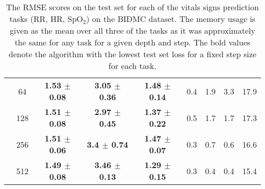 \begin{table}[t]
\begin{center}
\begin{tabular}{ccccccccc}
          & 64  &  \textbf{1.53 $\pm$ 0.08} &   \textbf{3.05 $\pm$ 0.36} &  \textbf{1.48 $\pm$ 0.14} &           0.4 &           1.9 &           3.3 &               17.9 \\
          & 128 &  \textbf{1.51 $\pm$ 0.08} &   \textbf{2.97 $\pm$ 0.45} &  \textbf{1.37 $\pm$ 0.22} &           0.5 &           1.7 &           1.7 &               17.3 \\
          & 256 &  \textbf{1.51 $\pm$ 0.06} &    \textbf{3.4 $\pm$ 0.74} &  \textbf{1.47 $\pm$ 0.07} &           0.3 &           0.7 &           0.6 &               16.6 \\
          & 512 &  \textbf{1.49 $\pm$ 0.08} &   \textbf{3.46 $\pm$ 0.13} &  \textbf{1.29 $\pm$ 0.15} &           0.3 &           0.4 &           0.4 &               15.4 \\
        \end{tabular}
    \end{center}
    \caption{The RMSE scores on the test set for each of the vitals signs prediction tasks (RR, HR, SpO$_2$) on the BIDMC dataset. The memory usage is given as the mean over all three of the tasks as it was approximately the same for any task for a given depth and step. The bold values denote the algorithm with the lowest test set loss for a fixed step size for each task.}
    \label{tab:bidmc_all}
\end{table}